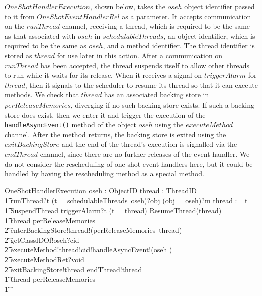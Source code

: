 $OneShotHandlerExecution$, shown below, takes the $oseh$ object
identifier passed to it from $OneShotEventHandlerRel$ as a parameter.
It accepts communication on the $runThread$ channel, receiving a
thread, which is required to be the same as that associated with
$oseh$ in $schedulableThreads$, an object identifier, which is
required to be the same as $oseh$, and a method identifier.
The thread identifier is stored as $thread$ for use later in this
action.
After a communication on $runThread$ has been accepted, the thread
suspends itself to allow other threads to run while it waits for its
release.
When it receives a signal on $triggerAlarm$ for $thread$, then it
signals to the scheduler to resume its thread so that it can execute
methods.
We check that $thread$ has an associated backing store in
$perReleaseMemories$, diverging if no such backing store exists. 
If such a backing store does exist, then we enter it and trigger the
execution of the \texttt{handleAsyncEvent()} method of the object
$oseh$ using the $executeMethod$ channel.
After the method returns, the backing store is exited using the
$exitBackingStore$ and the end of the thread's execution is signalled
via the $endThread$ channel, since there are no further releases of
the event handler.
We do not consider the rescheduling of one-shot event handlers here,
but it could be handled by having the rescheduling method as a special
method.
\begin{circusaction}
  OneShotHandlerExecution \circdef \circval oseh : ObjectID \circspot \circvar thread : ThreadID \circspot \\
  \t1 runThread?t \prefixcolon (t = schedulableThreads~oseh)?obj \prefixcolon (obj = oseh)?m \then thread := t \circseq \\
  \t1 SuspendThread \circseq triggerAlarm?t \prefixcolon (t = thread) \then ResumeThread(thread) \circseq \\
  \t1 \circif thread \in \dom perReleaseMemories \circthen {} \\
  \t2 enterBackingStore!thread!(perReleaseMemories~thread) \\
  \t2 {} \then getClassIDOf!oseh?cid \\
  \t2 {} \then executeMethod!thread!cid!handleAsyncEvent!(\langle oseh \rangle) \\
  \t2 {} \then executeMethodRet?void \\
  \t2 {} \then exitBackingStore!thread \then endThread!thread \then \Skip \\
  \t1 {} \circelse thread \notin \dom perReleaseMemories \circthen \Chaos \\
  \t1 \circfi
\end{circusaction}

